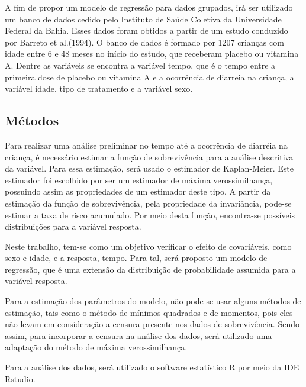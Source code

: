 \documentclass[a4paper,12pt]{article}
\begin{document}
A fim de propor um modelo de regressão para dados grupados, irá ser utilizado um banco de dados cedido pelo Instituto de Saúde Coletiva da Universidade Federal da Bahia. Esses dados foram obtidos a partir de um estudo conduzido por Barreto et al.(1994). O banco de dados é formado por 1207 crianças com idade entre 6 e 48 meses no início do estudo, que receberam placebo ou vitamina A. Dentre as variáveis se encontra a variável tempo, que é o tempo entre a primeira dose de placebo ou vitamina A e a ocorrência de diarreia na criança, a variável idade, tipo de tratamento e a variável sexo.

\subsection{Métodos}

Para realizar uma análise preliminar no tempo até a ocorrência de diarréia na criança, é necessário estimar a função de sobrevivência para a análise descritiva da variável. Para essa estimação, será usado o estimador de Kaplan-Meier. Este estimador foi escolhido por ser um estimador de máxima verossimilhança, possuindo assim as propriedades de um estimador deste tipo. A partir da estimação da função de sobrevivência, pela propriedade da invariância, pode-se estimar a taxa de risco acumulado. Por meio desta função, encontra-se possíveis distribuições para a variável resposta.

Neste trabalho, tem-se como um objetivo verificar o efeito de covariáveis, como sexo e idade, e a resposta, tempo. Para tal, será proposto um modelo de regressão, que é uma extensão da distribuição de probabilidade assumida para a variável resposta.

Para a estimação dos parâmetros do modelo, não pode-se usar alguns métodos de estimação, tais como o método de mínimos quadrados e de momentos, pois eles não levam em consideração a censura presente nos dados de sobrevivência. Sendo assim, para incorporar a censura na análise dos dados, será utilizado uma adaptação do método de máxima verossimilhança.

Para a análise dos dados, será utilizado o software estatístico R por meio da IDE Rstudio.


\newpage



\nocite{colosimo, Barreto}
\end{document}
